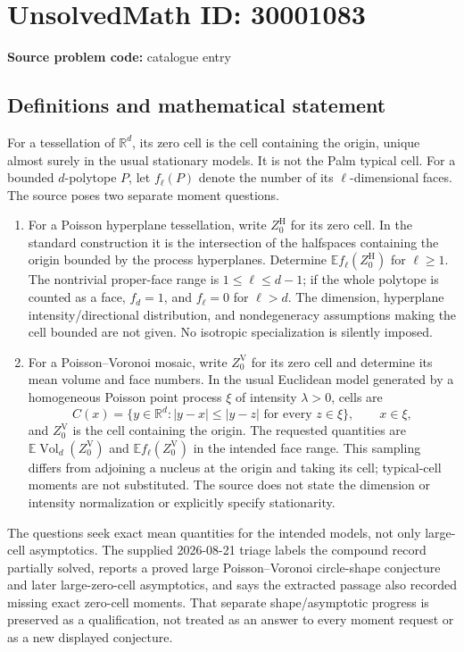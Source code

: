 \documentclass[11pt]{article}
\newcommand{\R}{\mathbb{R}}
\newcommand{\E}{\mathbb{E}}
\begin{document}
\section*{UnsolvedMath ID: 30001083}
\textbf{Source problem code:} catalogue entry
\subsection{Definitions and mathematical statement}
For a tessellation of $\R^d$, its zero cell is the cell containing the origin, unique almost surely in the usual stationary models. It is not the Palm typical cell. For a bounded $d$-polytope $P$, let $f_\ell(P)$ denote the number of its $\ell$-dimensional faces. The source poses two separate moment questions.\begin{enumerate}\item For a Poisson hyperplane tessellation, write $Z_0^{\mathrm H}$ for its zero cell. In the standard construction it is the intersection of the halfspaces containing the origin bounded by the process hyperplanes. Determine $\E f_\ell(Z_0^{\mathrm H})$ for $\ell\geq1$. The nontrivial proper-face range is $1\leq\ell\leq d-1$; if the whole polytope is counted as a face, $f_d=1$, and $f_\ell=0$ for $\ell>d$. The dimension, hyperplane intensity/directional distribution, and nondegeneracy assumptions making the cell bounded are not given. No isotropic specialization is silently imposed.\item For a Poisson--Voronoi mosaic, write $Z_0^{\mathrm V}$ for its zero cell and determine its mean volume and face numbers. In the usual Euclidean model generated by a homogeneous Poisson point process $\xi$ of intensity $\lambda>0$, cells are \[C(x)=\{y\in\R^d:|y-x|\leq|y-z|\text{ for every }z\in\xi\},\qquad x\in\xi,\] and $Z_0^{\mathrm V}$ is the cell containing the origin. The requested quantities are $\E\operatorname{Vol}_d(Z_0^{\mathrm V})$ and $\E f_\ell(Z_0^{\mathrm V})$ in the intended face range. This sampling differs from adjoining a nucleus at the origin and taking its cell; typical-cell moments are not substituted. The source does not state the dimension or intensity normalization or explicitly specify stationarity.\end{enumerate} The questions seek exact mean quantities for the intended models, not only large-cell asymptotics. The supplied 2026-08-21 triage labels the compound record partially solved, reports a proved large Poisson--Voronoi circle-shape conjecture and later large-zero-cell asymptotics, and says the extracted passage also recorded missing exact zero-cell moments. That separate shape/asymptotic progress is preserved as a qualification, not treated as an answer to every moment request or as a new displayed conjecture.
\end{document}
